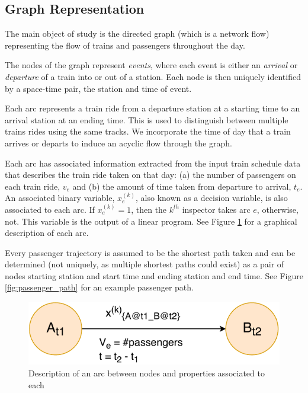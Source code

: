 \documentclass[11pt]{article}
\begin{document}
\subsection{Graph Representation}
\par The main object of study is the directed graph (which is a network flow) representing the flow of trains and passengers throughout the day.
\par The nodes of the graph represent \textit{events}, where each event is either an \textit{arrival} or \textit{departure} of a train into or out of a station. Each node is then uniquely identified by a space-time pair, the station and time of event.
\par Each arc represents a train ride from a departure station at a starting time to an arrival station at an ending time. This is used to distinguish between multiple trains rides using the same tracks. We incorporate the time of day that a train arrives or departs to induce an acyclic flow through the graph.
\par Each arc has associated information extracted from the input train schedule data that describes the train ride taken on that day: (a) the number of passengers on each train ride, $v_e$ and (b) the amount of time taken from departure to arrival, $t_e$. An associated binary variable, $x_e^{(k)}$, also known as a decision variable, is also associated to each arc. If $x_e^{(k)} = 1$, then the $k^{th}$ inspector takes arc $e$, otherwise, not. This variable is the output of a linear program. See Figure \ref{fig:arc} for a graphical description of each arc.
\par Every passenger trajectory is assumed to be the shortest path taken and can be determined (not uniquely, as multiple shortest paths could exist) as a pair of nodes starting station and start time and ending station and end time. See Figure \ref{fig:passenger_path} for an example passenger path.
\begin{figure}
    \centering
    \includegraphics[scale=0.7]{pics/nodes.pdf}
    \caption{Description of an arc between nodes and properties associated to each}
    \label{fig:arc}
\end{figure}
\end{document}
